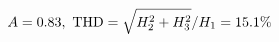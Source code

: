 \documentclass[preview]{standalone}
\begin{document}
\begin{align*}
\special{dvisvgm:raw <g id='unique000'>}A=0.83,\ \text{THD}=\sqrt{H_2^2+H_3^2}/H_1=15.1\%\special{dvisvgm:raw </g>}
\end{align*}
\end{document}
